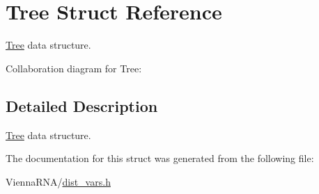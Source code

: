 \hypertarget{structTree}{}\section{Tree Struct Reference}
\label{structTree}


\mbox{\hyperlink{structTree}{Tree}} data structure.  




Collaboration diagram for Tree\+:


\subsection{Detailed Description}
\mbox{\hyperlink{structTree}{Tree}} data structure. 

The documentation for this struct was generated from the following file\+:\begin{DoxyCompactItemize}
\item 
Vienna\+R\+N\+A/\mbox{\hyperlink{dist__vars_8h}{dist\+\_\+vars.\+h}}\end{DoxyCompactItemize}
